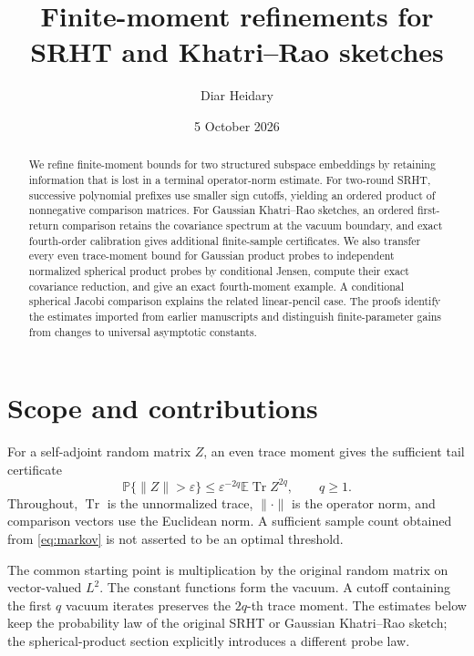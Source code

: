 \documentclass[11pt,a4paper]{article}
\title{Finite-moment refinements for\\SRHT and Khatri--Rao sketches}
\author{Diar Heidary}
\date{5 October 2026}
\theoremstyle{definition}\newtheorem{definition}[theorem]{Definition}
\theoremstyle{remark}\newtheorem{remark}[theorem]{Remark}
\newcommand{\E}{\mathbb E}\newcommand{\Prob}{\mathbb P}
\newcommand{\Tr}{\operatorname{Tr}}\newcommand{\tr}{\operatorname{Tr}}
\newcommand{\norm}[1]{\lVert#1\rVert}\newcommand{\ip}[2]{\langle#1,#2\rangle}
\numberwithin{equation}{section}
\begin{document}
\maketitle
\begin{abstract}
We refine finite-moment bounds for two structured subspace embeddings by
retaining information that is lost in a terminal operator-norm estimate.
For two-round SRHT, successive polynomial prefixes use smaller sign
cutoffs, yielding an ordered product of nonnegative comparison matrices.
For Gaussian Khatri--Rao sketches, an ordered first-return comparison
retains the covariance spectrum at the vacuum boundary, and exact
fourth-order calibration gives additional finite-sample certificates.
We also transfer every even trace-moment bound for Gaussian product
probes to independent normalized spherical product probes by conditional
Jensen, compute their exact covariance reduction, and give an exact
fourth-moment example. A conditional spherical Jacobi comparison explains
the related linear-pencil case. The proofs identify the estimates
imported from earlier manuscripts and distinguish finite-parameter gains
from changes to universal asymptotic constants.
\end{abstract}
\tableofcontents
\section{Scope and contributions}\label{sec:introduction}
For a self-adjoint random matrix $Z$, an even trace moment gives the
sufficient tail certificate
\begin{equation}\label{eq:markov}
 \Prob\{\norm Z>\varepsilon\}
 \le \varepsilon^{-2q}\E\Tr Z^{2q},\qquad q\ge1.
\end{equation}
Throughout, $\Tr$ is the unnormalized trace, $\norm\cdot$ is the operator
norm, and comparison vectors use the Euclidean norm. A sufficient sample
count obtained from \eqref{eq:markov} is not asserted to be an optimal
threshold.

The common starting point is multiplication by the original random
matrix on vector-valued $L^2$. The constant functions form the vacuum.
A cutoff containing the first $q$ vacuum iterates preserves the
$2q$-th trace moment. The estimates below keep the probability law of the
original SRHT or Gaussian Khatri--Rao sketch; the spherical-product
section explicitly introduces a different probe law.
\end{document}
